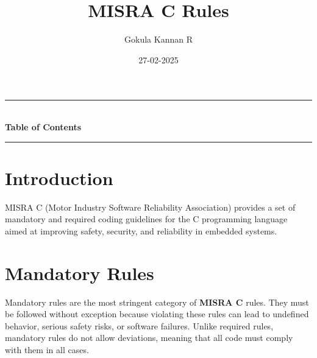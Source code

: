 \documentclass{article}
\title{MISRA C Rules}
\author{Gokula Kannan R}
\date{27-02-2025}
\begin{document}
\maketitle

\clearpage
{}
{}

\begin{center}
    \rule{\textwidth}{0.5mm} \\ [0.4cm]
    \textbf{\huge Table of Contents} \\ [0.2cm]
    \rule{\textwidth}{0.5mm}
\end{center}

\tableofcontents

\newpage

\section{Introduction}
MISRA C (Motor Industry Software Reliability Association) provides a set of mandatory and required coding guidelines for the C programming language aimed at improving safety, security, and reliability in embedded systems.

\section{Mandatory Rules}
Mandatory rules are the most stringent category of \textbf{MISRA C} rules. They must be followed without exception because violating these rules can lead to undefined behavior, serious safety risks, or software failures. Unlike required rules, mandatory rules do not allow deviations, meaning that all code must comply with them in all cases.
\end{document}
